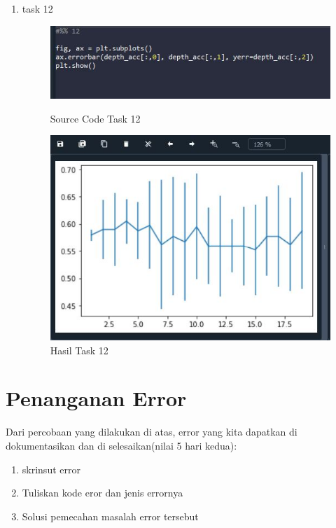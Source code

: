 \begin{enumerate}
\newpage
\item task 12
\begin{figure}[!htbp]
    \centering
    \includegraphics[scale=0.5]{figures/Chap12-1.JPG}
	\caption{Source Code Task 12}
    \includegraphics[scale=0.5]{figures/Chap12-1.1.JPG}
	\caption{Hasil Task 12}
\end{figure}

\end{enumerate}


\section{Penanganan Error}
Dari percobaan yang dilakukan di atas, error yang kita dapatkan di dokumentasikan dan di selesaikan(nilai 5 hari kedua):

\begin{enumerate}
	\item
skrinsut error
	\item
Tuliskan kode eror dan jenis errornya
	\item
Solusi pemecahan masalah error tersebut

\end{enumerate}

